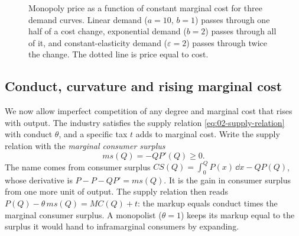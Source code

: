 \begin{figure}[htbp]
\centering
{}
\caption{Monopoly price as a function of constant marginal cost for three demand curves. Linear demand
($a = 10$, $b = 1$) passes through one half of a cost change, exponential demand ($b = 2$) passes through all
of it, and constant-elasticity demand ($\varepsilon = 2$) passes through twice the change. The dotted line is
price equal to cost.}
\label{fig:02-pt-examples}
\end{figure}

\subsection{Conduct, curvature and rising marginal cost}\label{sec:02-pt-general}

We now allow imperfect competition of any degree and marginal cost that rises with output. The industry
satisfies the supply relation \eqref{eq:02-supply-relation} with conduct $\theta$, and a specific tax $t$ adds to
marginal cost. Write the supply relation with the \emph{marginal consumer surplus}
\begin{equation}\label{eq:02-ms}
ms(Q) = -QP'(Q) \ge 0 .
\end{equation}
The name comes from consumer surplus $CS(Q) = \int_0^Q P(x)\,\dd x - QP(Q)$, whose derivative is
$P - P - QP' = ms(Q)$. It is the gain in consumer surplus from one more unit of output. The supply relation then
reads $P(Q) - \theta\, ms(Q) = MC(Q) + t$: the markup equals conduct times the marginal consumer surplus. A
monopolist ($\theta = 1$) keeps its markup equal to the surplus it would hand to inframarginal consumers by
expanding.

